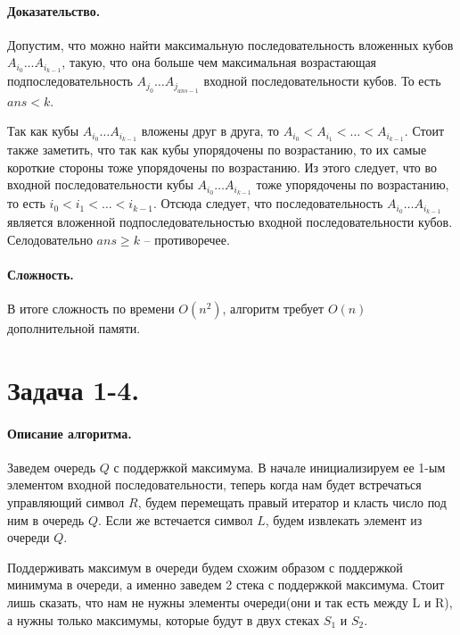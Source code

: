 \documentclass[12pt]{article}
\begin{document}
\paragraph{Доказательство.}
Допустим, что можно найти максимальную последовательность вложенных кубов $ A_{i_0} \dots A_{i_{k-1}} $, такую, что она больше
чем максимальная возрастающая подпоследовательность $ A_{j_0} \dots A_{j_{ans - 1}} $ входной последовательности кубов.
То есть $ ans < k $.

Так как кубы $ A_{i_0} \dots A_{i_{k-1}} $ вложены друг в друга, то $ A_{i_0} < A_{i_1} < \dots < A_{i_{k-1}} $. Стоит также
заметить, что так как кубы упорядочены по возрастанию, то их самые короткие стороны тоже упорядочены по возрастанию.
Из этого следует, что во входной последовательности кубы $ A_{i_0} \dots A_{i_{k-1}} $ тоже упорядочены по возрастанию, то
есть $ i_0 < i_1 < \dots < i_{k-1} $. Отсюда следует, что последовательность $ A_{i_0} \dots A_{i_{k-1}} $ является вложенной
подпоследовательностью входной последовательности кубов. Селодовательно $ ans \ge k $ -- противоречее.


\paragraph{Сложность.}
В итоге сложность по времени $ O(n^2) $, алгоритм требует $ O(n) $ дополнительной памяти.




\section{Задача 1-4.} 
\paragraph{Описание алгоритма.}
Заведем очередь $ Q $ с поддержкой максимума. В начале инициализируем ее 1-ым элементом входной последовательности, 
теперь когда нам будет встречаться управляющий символ $ R $, будем перемещать правый
итератор и класть число под ним в очередь $ Q $. Если же встечается символ $ L $, будем извлекать 
элемент из очереди $ Q $.

Поддерживать максимум в очереди будем схожим образом с поддержкой минимума в очереди, а именно заведем 2 стека с 
поддержкой максимума. Стоит лишь сказать, что нам не нужны элементы очереди(они и так есть между L и R), 
а нужны только максимумы, которые будут в двух стеках $ S_1 $ и $ S_2 $. 
\end{document}

